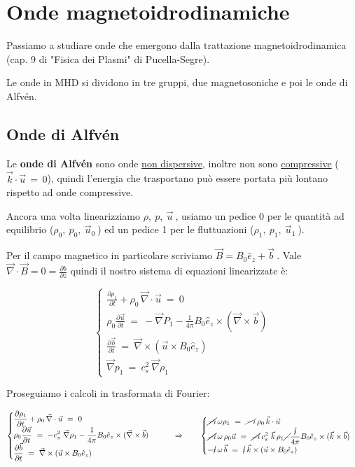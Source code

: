 \section{Onde magnetoidrodinamiche}

Passiamo a studiare onde che emergono dalla trattazione magnetoidrodinamica (cap. 9 di "Fisica dei Plasmi" di Pucella-Segre).

Le onde in MHD si dividono in tre gruppi, due magnetosoniche e poi le onde di Alfvén.

\subsection{Onde di Alfvén}

Le \textbf{onde di Alfvén} sono onde \underline{non dispersive}, inoltre non sono \underline{compressive} ($\vec k \cdot \vec u\, =\, 0$), quindi l'energia che trasportano può essere portata più lontano rispetto ad onde compressive.

Ancora una volta linearizziamo $\rho,\ p,\ \vec u\ $, usiamo un pedice 0 per le quantità ad equilibrio ($\rho_0,\ p_0,\ \vec u_0\ $) ed un pedice 1 per le fluttuazioni ($\rho_1,\ p_1,\ \vec u_1\ $). 

Per il campo magnetico in particolare scriviamo $\vec B = B_0 \hat e_z + \vec b\ $.
Vale $\vec\nabla\cdot \vec B=0=\frac{\partial b}{\partial z}$ quindi il nostro sistema di equazioni linearizzate è:

\[\begin{cases}
	\displaystyle \frac{\partial \rho_1}{\partial t} + \rho_0\,\vec \nabla\cdot \vec u\ =\ 0\\
	\displaystyle \rho_0 \frac{\partial \vec u}{\partial t}\ =\ -\vec \nabla P_1 - \frac{1}{4\pi}B_0 \hat e_z\times (\vec \nabla\times\vec b)\\
	\displaystyle \frac{\partial \vec b}{\partial t}\ =\ \vec \nabla \times (\vec u \times B_0\hat e_z)\\
	\vec \nabla p_1\ =\ c_s^2\ \vec \nabla \rho_1
\end{cases}\]

Proseguiamo i calcoli in trasformata di Fourier:

\[
\begin{cases}
	\displaystyle \frac{\partial \rho_1}{\partial t} + \rho_0\,\vec \nabla\cdot \vec u\ =\ 0\\
	\displaystyle \rho_0 \frac{\partial \vec u}{\partial t}\ =\ -c_s^2\ \vec \nabla \rho_1 - \frac{1}{4\pi}B_0 \hat e_z\times (\vec \nabla\times\vec b)\\
	\displaystyle \frac{\partial \vec b}{\partial t}\ =\ \vec \nabla \times (\vec u\times  B_0 \hat e_z)
\end{cases}
\quad \quad \Rightarrow \quad \quad 
\begin{cases}
	\cancel{-i}\,\omega\rho_1\ =\ \cancel{-\,i}\,\rho_0\, \vec k\cdot \vec u \\
	\displaystyle \cancel{-i}\, \omega\,\rho_0 \vec u\ =\ \cancel{- i}\,c_s^2\ \vec k\,\rho_1 \cancel{-} \frac{\cancel{i}}{4\pi}B_0 \hat e_z\times (\vec k\times\vec b)\\
	-\cancel{i}\, \omega\,  \vec b\ =\ \cancel{i}\,\vec k \times (\vec u\times  B_0 \hat e_z)
\end{cases}
\]


